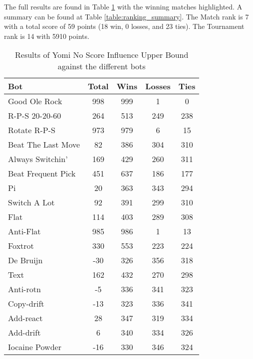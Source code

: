 The full results are found in Table \ref{table:Yomi_NoScoreInfluence_UpperBound_results} with the winning matches highlighted. A summary can be found at Table \ref{table:ranking_summary}. The Match rank is 7 with a total score of 59 points (18 win, 0 losses, and 23 ties). The Tournament rank is 14 with 5910 points.

\begin{table}
    \caption{Results of Yomi No Score Influence Upper Bound against the different bots}
    \label{table:Yomi_NoScoreInfluence_UpperBound_results}
    \centering
    \begin{tabular}{|l|c|c|c|c|}
        \hline
        \textbf{Bot} & \textbf{Total} & \textbf{Wins} & \textbf{Losses} & \textbf{Ties} \\ \hline
\rowcolor{HighlightRowColor} Good Ole Rock & 998 & 999 & 1 & 0 \\ \hline 
\rowcolor{HighlightRowColor} R-P-S 20-20-60 & 264 & 513 & 249 & 238 \\ \hline 
\rowcolor{HighlightRowColor} Rotate R-P-S & 973 & 979 & 6 & 15 \\ \hline 
\rowcolor{HighlightRowColor} Beat The Last Move & 82 & 386 & 304 & 310 \\ \hline 
\rowcolor{HighlightRowColor} Always Switchin' & 169 & 429 & 260 & 311 \\ \hline 
\rowcolor{HighlightRowColor} Beat Frequent Pick & 451 & 637 & 186 & 177 \\ \hline 
Pi & 20 & 363 & 343 & 294 \\ \hline 
\rowcolor{HighlightRowColor} Switch A Lot & 92 & 391 & 299 & 310 \\ \hline 
\rowcolor{HighlightRowColor} Flat & 114 & 403 & 289 & 308 \\ \hline 
\rowcolor{HighlightRowColor} Anti-Flat & 985 & 986 & 1 & 13 \\ \hline 
\rowcolor{HighlightRowColor} Foxtrot & 330 & 553 & 223 & 224 \\ \hline 
De Bruijn & -30 & 326 & 356 & 318 \\ \hline 
\rowcolor{HighlightRowColor} Text & 162 & 432 & 270 & 298 \\ \hline 
Anti-rotn & -5 & 336 & 341 & 323 \\ \hline 
Copy-drift & -13 & 323 & 336 & 341 \\ \hline 
Add-react & 28 & 347 & 319 & 334 \\ \hline 
Add-drift & 6 & 340 & 334 & 326 \\ \hline 
Iocaine Powder & -16 & 330 & 346 & 324 \\ \hline 

\end{tabular}
\end{table}
